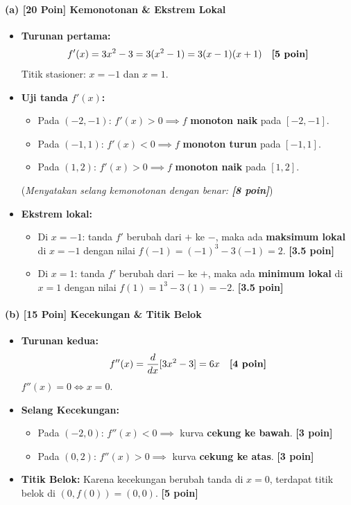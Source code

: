 \documentclass[11pt,a4paper]{article}
\begin{document}
\paragraph{(a) [20 Poin] Kemonotonan \& Ekstrem Lokal}
\begin{itemize}[leftmargin=18pt]
    \item \textbf{Turunan pertama:}
    \[
    f'(x) = 3x^2 - 3 = 3(x^2 - 1) = 3(x-1)(x+1) \quad \text{\textbf{[5 poin]}}
    \]
    Titik stasioner: $x = -1$ dan $x = 1$.
    \item \textbf{Uji tanda $f'(x)$:}
    \begin{itemize}
        \item Pada $(-2, -1)$: $f'(x) > 0 \implies f$ \textbf{monoton naik} pada $[-2, -1]$.
        \item Pada $(-1, 1)$: $f'(x) < 0 \implies f$ \textbf{monoton turun} pada $[-1, 1]$.
        \item Pada $(1, 2)$: $f'(x) > 0 \implies f$ \textbf{monoton naik} pada $[1, 2]$.
    \end{itemize}
    (\textit{Menyatakan selang kemonotonan dengan benar: \textbf{[8 poin]}})
    \item \textbf{Ekstrem lokal:}
    \begin{itemize}
        \item Di $x = -1$: tanda $f'$ berubah dari $+$ ke $-$, maka ada \textbf{maksimum lokal} di $x = -1$ dengan nilai $f(-1) = (-1)^3 - 3(-1) = 2$. \textbf{[3.5 poin]}
        \item Di $x = 1$: tanda $f'$ berubah dari $-$ ke $+$, maka ada \textbf{minimum lokal} di $x = 1$ dengan nilai $f(1) = 1^3 - 3(1) = -2$. \textbf{[3.5 poin]}
    \end{itemize}
\end{itemize}

\paragraph{(b) [15 Poin] Kecekungan \& Titik Belok}
\begin{itemize}[leftmargin=18pt]
    \item \textbf{Turunan kedua:}
    \[
    f''(x) = \frac{d}{dx}[3x^2 - 3] = 6x \quad \text{\textbf{[4 poin]}}
    \]
    $f''(x) = 0 \iff x = 0$.
    \item \textbf{Selang Kecekungan:}
    \begin{itemize}
        \item Pada $(-2, 0)$: $f''(x) < 0 \implies$ kurva \textbf{cekung ke bawah}. \textbf{[3 poin]}
        \item Pada $(0, 2)$: $f''(x) > 0 \implies$ kurva \textbf{cekung ke atas}. \textbf{[3 poin]}
    \end{itemize}
    \item \textbf{Titik Belok:}
    Karena kecekungan berubah tanda di $x = 0$, terdapat titik belok di $(0, f(0)) = (0, 0)$. \textbf{[5 poin]}
\end{itemize}
\end{document}
